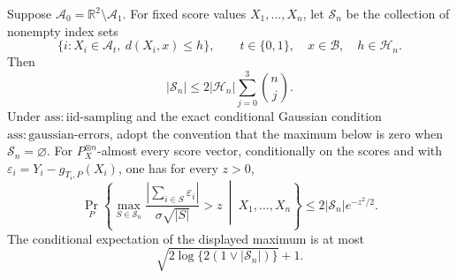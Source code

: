 Suppose \(\mathcal A_0=\mathbb R^2\setminus\mathcal A_1\). For fixed score values \(X_1,\ldots,X_n\), let \(\mathscr S_n\) be the collection of nonempty index sets
\[
 \{i:X_i\in\mathcal A_t,\ d(X_i,x)\le h\},
 \qquad t\in\{0,1\},\quad x\in\mathcal B,\quad h\in\mathcal H_n.
\]
Then
\[
 |\mathscr S_n|\le 2|\mathcal H_n|\sum_{j=0}^3\binom nj.
\]
Under \(\mathrm{ass:iid\text{-}sampling}\) and the exact conditional Gaussian condition \(\mathrm{ass:gaussian\text{-}errors}\), adopt the convention that the maximum below is zero when \(\mathscr S_n=\varnothing\). For \(P_X^{\otimes n}\)-almost every score vector, conditionally on the scores and with \(\varepsilon_i=Y_i-g_{T_i,P}(X_i)\), one has for every \(z>0\),
\[
 \Pr_P\left\{\max_{S\in\mathscr S_n}
 \frac{|\sum_{i\in S}\varepsilon_i|}{\sigma\sqrt{|S|}}>z
 \ \middle|\ X_1,\ldots,X_n\right\}
 \le 2|\mathscr S_n|e^{-z^2/2}.
\]
The conditional expectation of the displayed maximum is at most
\[
 \sqrt{2\log\{2(1\vee|\mathscr S_n|)\}}+1.
\]